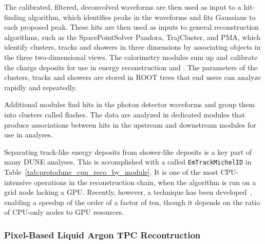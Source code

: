 The calibrated, filtered, deconvolved waveforms are then used as input to a hit-finding algorithm, which identifies peaks in the waveforms and fits Gaussians to each proposed peak.  These hits are then used as inputs to general reconstruction algorithms, such as the SpacePointSolver Pandora, TrajCluster, and PMA, which identify clusters, tracks and showers in three dimensions by associating objects in the three two-dimensional views.  The calorimetry modules sum up and calibrate the charge deposits for use in energy reconstruction and .  The parameters of the clusters, tracks and showers are stored in ROOT trees that end users can analyze rapidly and repeatedly.

Additional modules find hits in the photon detector waveforms and group them into clusters called flashes.  The  data are analyzed in dedicated modules that produce associations between hits in the upstream and downstream  modules for use in analyses.

Separating track-like energy deposits from shower-like deposits is a key part of many DUNE analyses.  This is accomplished with a  called {\tt EmTrackMichelID} in Table~\ref{tab:protodune_cpu_reco_by_module}.  It is one of the most CPU-intensive operations in the  reconstruction chain, when the algorithm is run on a grid node lacking a GPU.  Recently, however, a  technique has been developed~\cite{Wang:2020fjr}, enabling a speedup of the order of a factor of ten, though it depends on the ratio of CPU-only nodes to GPU resources.


\subsubsection{Pixel-Based Liquid Argon TPC Recontruction}
\label{sec:algo:reco:lartpc:pixels}

